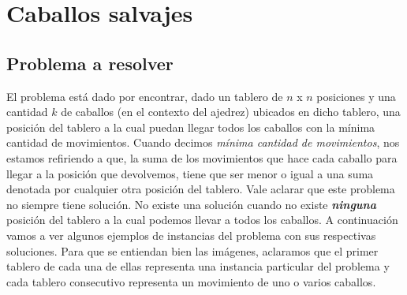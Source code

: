 \documentclass[a4paper]{article}
\begin{document}
\section{Caballos salvajes}
\subsection{Problema a resolver}
El problema est\'a dado por encontrar, dado un tablero de $n$ x $n$ posiciones y una cantidad $k$ de caballos (en el contexto del ajedrez) ubicados en dicho tablero, una posición del tablero a la cual puedan llegar todos los caballos con la mínima cantidad de movimientos. Cuando decimos \textit{m\'inima cantidad de movimientos}, nos estamos refiriendo a que, la suma de los movimientos que hace cada caballo para llegar a la posici\'on que devolvemos, tiene que ser menor o igual a una suma denotada por cualquier otra posición del tablero.
\newline Vale aclarar que este problema no siempre tiene solución. No existe una solución cuando no existe \textit{\textbf{ninguna}} posición del tablero a la cual podemos llevar a todos los caballos.
\newline A continuación vamos a ver algunos ejemplos de instancias del problema con sus respectivas soluciones. Para que se entiendan bien las imágenes, aclaramos que el primer tablero de cada una de ellas representa una instancia particular del problema y cada tablero consecutivo representa un movimiento de uno o varios caballos.
\end{document}
